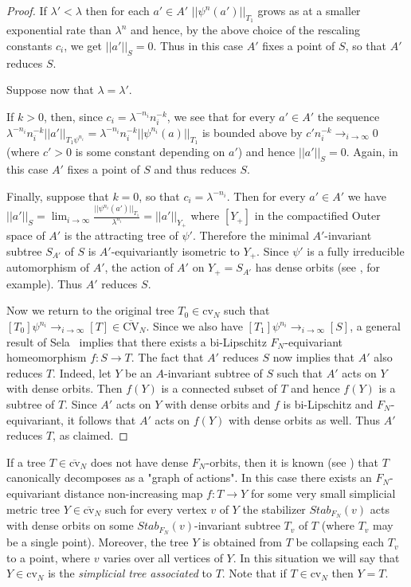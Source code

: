 \documentclass[10pt]{amsart}
\newcommand\<{\langle}
\renewcommand\>{\rangle}
\newcommand{\cvn}{\mbox{cv}_N}
\newcommand{\cvnbar}{\overline{\mbox{cv}}_N}
\newcommand{\CVNbar}{\overline{\mbox{CV}}_N}
\theoremstyle{definition}
\begin{document}
\begin{proof}
If $\lambda'<\lambda$ then for each $a'\in A'$  $||\psi^n(a')||_{T_1}$ grows as at a smaller exponential rate than $\lambda^n$ and hence, by the above choice of the rescaling constants $c_i$, we get
 $||a'||_S=0$. Thus in this case $A'$ fixes a point of $S$, so that $A'$ reduces $S$.

Suppose now that $\lambda=\lambda'$.  

If $k>0$, then, since $c_i=\lambda^{-n_i}n_i^{-k}$, we see that for every $a'\in A'$ the sequence  $\lambda^{-n_i}n_i^{-k}||a'||_{T_1 \psi^{n_i}}=\lambda^{-n_i}n_i^{-k}||\psi^{n_i}(a)||_{T_1}$ is bounded above by $c' n_i^{-k}\to_{i\to\infty} 0$ (where $c'>0$ is some constant depending on $a'$) and hence $||a'||_S=0$.  Again, in this case $A'$ fixes a point of $S$ and thus reduces $S$.


Finally, suppose that $k=0$, so that $c_i=\lambda^{-n_i}$.
Then for every $a'\in A'$ we have $||a'||_S=\lim_{i\to\infty} \frac{||\psi^{n_i}(a') ||_{T_1}}{\lambda^{n_i}}=||a'||_{Y_+}$ where $[Y_+]$ in
the compactified Outer space  of $A'$ is the attracting tree of
$\psi'$. Therefore the minimal $A'$-invariant subtree $S_{A'}$ of $S$ is
$A'$-equivariantly isometric to $Y_+$. Since $\psi'$ is a fully
irreducible automorphism of $A'$, the action of $A'$ on $Y_+=S_{A'}$ has
dense orbits (see \cite{LL}, for example). Thus $A'$ reduces $S$.

Now we return to the original tree $T_0\in\cvn$ such that $[T_0]\psi^{n_i}\to_{i\to\infty} [T]\in\CVNbar$.
Since we also have $[T_1]\psi^{n_i}\to_{i\to\infty} [S]$, a general result of Sela~\cite{Sela} implies that  there exists a
bi-Lipschitz $F_N$-equivariant homeomorphism $f: S\to T$. 
The fact that $A'$ reduces $S$ now implies that $A'$ also reduces $T$.  Indeed,
let $Y$ be an $A$-invariant subtree of $S$ such that $A'$ acts on $Y$ with dense orbits. Then $f(Y)$ is a connected subset of $T$ and hence $f(Y)$ is a subtree of $T$.
Since $A'$ acts on $Y$ with dense orbits and $f$ is bi-Lipschitz and $F_N$-equivariant, it follows that $A'$ acts on $f(Y)$ with dense orbits as well. Thus $A'$ reduces $T$, as claimed.
\end{proof}







If a tree $T\in\cvnbar$ does not have dense $F_N$-orbits, then it is known (see \cite{CHL2,Rey,KL3}) that $T$ canonically decomposes as a "graph of actions".
In this case there exists an $F_N$-equivariant distance non-increasing map $f:T\to Y$ for some very small simplicial metric tree $Y\in\cvnbar$ such for every vertex $v$
  of $Y$ the stabilizer $Stab_{F_N}(v)$ acts with dense orbits on some $Stab_{F_N}(v)$-invariant subtree $T_v$ of $T$ (where $T_v$ may be a single point). Moreover, the tree $Y$ is obtained from $T$ be collapsing each $T_v$ to a point, where $v$ varies over all vertices of $Y$.  In this situation we will say that  $Y\in\cvn$ is the \emph{simplicial tree associated} to $T$. 
Note that if $T\in\cvn$ then $Y=T$.
\end{document}
